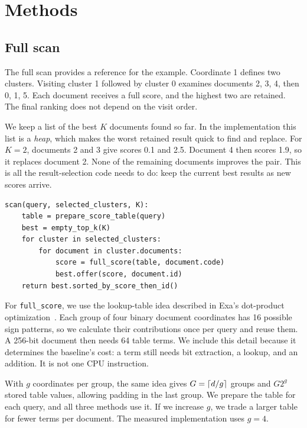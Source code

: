 \section{Methods}
\subsection{Full scan}
The full scan provides a reference for the example. Coordinate 1 defines two clusters.
Visiting cluster 1 followed by cluster 0 examines documents 2, 3, 4, then 0, 1, 5.
Each document receives a full score, and the highest two are retained. The final ranking
does not depend on the visit order.

We keep a list of the best $K$ documents found so far. In the implementation this list is a
\emph{heap}, which makes the worst retained result quick to find and replace. For $K=2$,
documents 2 and 3 give scores 0.1 and 2.5. Document 4 then scores 1.9, so it replaces document 2.
None of the remaining documents improves the pair. This is all the result-selection code
needs to do: keep the current best results as new scores arrive.

\begin{lstlisting}[caption={Full scan. Every selected document receives a full score.}]
scan(query, selected_clusters, K):
    table = prepare_score_table(query)
    best = empty_top_k(K)
    for cluster in selected_clusters:
        for document in cluster.documents:
            score = full_score(table, document.code)
            best.offer(score, document.id)
    return best.sorted_by_score_then_id()
\end{lstlisting}

For \texttt{full\_score}, we use the lookup-table idea described in Exa's dot-product
optimization~\cite{exa}. Each group of four binary document coordinates has 16 possible sign
patterns, so we calculate their contributions once per query and reuse them. A 256-bit document
then needs 64 table terms. We include this detail because it determines the baseline's cost:
a term still needs bit extraction, a lookup, and an addition. It is not one CPU instruction.

With $g$ coordinates per group, the same idea gives $G=\left\lceil d/g\right\rceil$ groups and $G2^g$ stored
table values, allowing padding in the last group. We prepare the table for each query, and
all three methods use it. If we increase $g$, we trade a larger table for fewer terms per
document. The measured implementation uses $g=4$.

